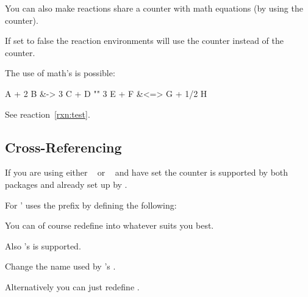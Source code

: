 \documentclass{chemmacros-manual}
\begin{document}
You can also make reactions share a counter with math
equations (by using the  counter).
\begin{options}
    If set to false the reaction environments will use the 
    counter instead of the  counter.
\end{options}

The use of \AmS math's  is possible:
\begin{example}
  \begin{reactions}
    A + 2 B &-> 3 C + D "\label{rxn:test}"
    3 E + F &<=> G + 1/2 H
  \end{reactions}
  See reaction~\ref{rxn:test}.
\end{example}

\subsection{Cross-Referencing}
If you are using either ~\cite{pkg:cleveref}
or ~\cite{pkg:fancyref} and have set 
the  counter is supported by both packages and already set up by
\chemmacros.

For  \chemmacros' uses the prefix  by defining the
following:
\begin{sourcecode}
  \newcommand*\fancyrefrctlabelprefix{rct}
\end{sourcecode}
You can of course redefine  into whatever suits you
best.

Also 's  is supported.
\begin{options}
    Change the name used by 's
    .

    Alternatively you can just redefine .
\end{options}
\end{document}
